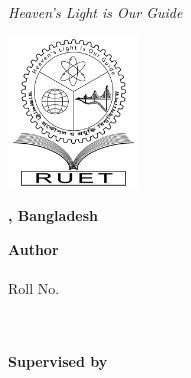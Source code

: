 \begin{center}
    \textit{Heaven's Light is Our Guide}
    \vspace{1cm}
    
    \includegraphics[height=4cm]{imgs/RUET_logo_bw.png}
    \vspace{1cm}
    
    \textbf{{\fontsize{14pt}{0.5cm}\selectfont \dept}}
    \vspace{1cm}
    
    \textbf{{\fontsize{14pt}{0.5cm}\selectfont \ruet, Bangladesh}}
    \vspace{1cm}

    \textbf{{\fontsize{16pt}{0.5cm}\selectfont \thesistitle}}
    \vspace{1cm}

    {\fontsize{14pt}{0.5cm}\selectfont
        \textbf{Author}\\
        \authorname\\
        Roll No. \authorroll\\
        \dept\\
        \ruet\\
        \vspace{1cm}

        \textbf{Supervised by}\\
        \thesissupervisor\\
        \thesissupervisordesignation\\
        \dept\\
        \ruet\\
        \vspace{1cm}
    }

\end{center}
\clearpage